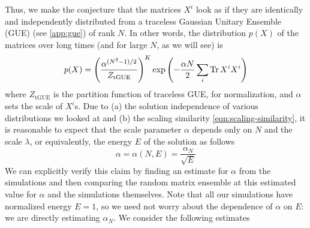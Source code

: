 Thus, we make the conjecture that the matrices $X^i$ look as if they are identically and independently distributed from a traceless Gaussian Unitary Ensemble (GUE) (see \cref{app:gue}) of rank $N$. In other words, the distribution $p(X)$ of the matrices over long times (and for large $N$, as we will see) is
\begin{equation}\label{eqn:conjecture-distribution}
    p(X) = \left( \frac{\alpha^{(N^2-1)/2}}{Z_{\text{tGUE}}} \right)^K \exp \left( - \frac{\alpha N}{2} \sum_{i} \Tr X^i X^i \right)
\end{equation}
where $Z_{\text{tGUE}}$ is the partition function of traceless GUE, for normalization, and $\alpha$ sets the scale of $X^i$s. Due to (a) the solution independence of various distributions we looked at and (b) the scaling similarity \cref{eqn:scaling-similarity}, it is reasonable to expect that the scale parameter $\alpha$ depends only on $N$ and the scale $\lambda$, or equivalently, the energy $E$ of the solution as follows
\begin{equation}
    \alpha = \alpha(N, E) = \frac{\alpha_N}{\sqrt{E}}
\end{equation}
We can explicitly verify this claim by finding an estimate for $\alpha$ from the simulations and then comparing the random matrix ensemble at this estimated value for $\alpha$ and the simulations themselves. Note that all our simulations have normalized energy $E = 1$, so we need not worry about the dependence of $\alpha$ on $E$: we are directly estimating $\alpha_N$. We consider the following estimates
